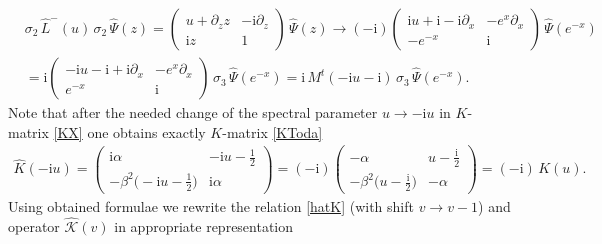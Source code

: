 \documentclass[11pt]{article}
\numberwithin{equation}{section}
\theoremstyle{plain}
\theoremstyle{definition}
\def\dd{\partial}
\renewcommand{\imath}{\mathrm{i}}
\begin{document}
\begin{align*}
	&\sigma_2\,\hat{L}^-(u)\,\sigma_2\,\hat{\Psi}(z)  = \left(\begin{array}{cc}
		u + \dd_z z & -\imath\partial_z \\
		\imath z & 1 \end{array}\right)\,\hat{\Psi}(z)  
	\longrightarrow  (-\imath)\left(\begin{array}{cc}
		\imath u+\imath-\imath\partial_x &  -e^{x}\partial_x \\
		-e^{-x} & \imath \end{array}\right)\,\hat{\Psi}(e^{-x}) \\ 
	&= \imath \left(\begin{array}{cc}
		-\imath u-\imath+\imath\partial_x &  -e^{x}\partial_x \\
		e^{-x} & \imath \end{array}\right)\,\sigma_3\,\hat{\Psi}(e^{-x}) = 
	\imath\,M^t(-\imath u-\imath)\,\sigma_3\,\hat{\Psi}(e^{-x}).
\end{align*}
Note that after the needed change of the spectral parameter $u \to -\imath u $
in $K$-matrix \eqref{KX} one obtains exactly $K$-matrix \eqref{KToda}
\begin{align}
	\hat{K}(-\imath u) = \begin{pmatrix}
		\imath\alpha & -\imath u - \frac{1}{2} \\[6pt]
		- \beta^2 \bigl(-\imath u - \frac{1}{2} \bigr) & \imath\alpha
	\end{pmatrix} = (-\imath)  
	\begin{pmatrix}
		-\alpha & u - \frac{\imath}{2} \\[6pt]
		- \beta^2 \bigl(u - \frac{\imath}{2} \bigr) & -\alpha
	\end{pmatrix} = (-\imath)\,K(u).
\end{align}
Using obtained formulae we rewrite the relation \eqref{hatK} (with shift $v \to v-1$) and operator $\hat{\mathcal{K}}(v)$ in appropriate representation 
\end{document}
